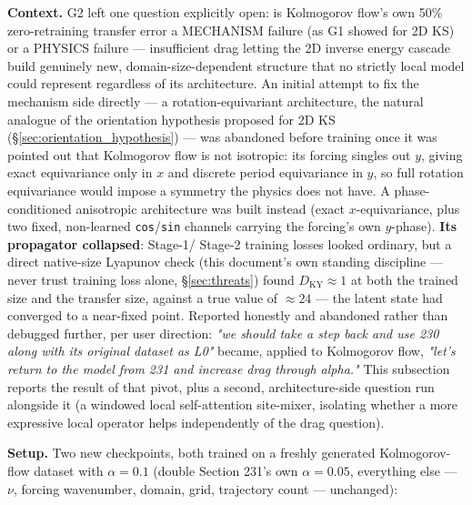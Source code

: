 \documentclass[11pt]{article}
\begin{document}
\textbf{Context.} G2 left one question explicitly open: is Kolmogorov
flow's own 50\% zero-retraining transfer error a MECHANISM failure (as
G1 showed for 2D KS) or a PHYSICS failure --- insufficient drag letting
the 2D inverse energy cascade build genuinely new, domain-size-dependent
structure that no strictly local model could represent regardless of its
architecture. An initial attempt to fix the mechanism side directly ---
a rotation-equivariant architecture, the natural analogue of the
orientation hypothesis proposed for 2D KS
(\S\ref{sec:orientation_hypothesis}) --- was abandoned before training
once it was pointed out that Kolmogorov flow is not isotropic: its
forcing singles out $y$, giving exact equivariance only in $x$ and
discrete period equivariance in $y$, so full rotation equivariance would
impose a symmetry the physics does not have. A phase-conditioned
anisotropic architecture was built instead (exact $x$-equivariance, plus
two fixed, non-learned \texttt{cos}/\texttt{sin} channels carrying the
forcing's own $y$-phase). \textbf{Its propagator collapsed}: Stage-1/
Stage-2 training losses looked ordinary, but a direct native-size
Lyapunov check (this document's own standing discipline --- never trust
training loss alone, \S\ref{sec:threats}) found $D_{\mathrm{KY}}\approx1$
at both the trained size and the transfer size, against a true value of
$\approx24$ --- the latent state had converged to a near-fixed point.
Reported honestly and abandoned rather than debugged further, per
user direction: \emph{"we should take a step back and use 230 along
with its original dataset as L0"} became, applied to Kolmogorov flow,
\emph{"let's return to the model from 231 and increase drag through
alpha."} This subsection reports the result of that pivot, plus a
second, architecture-side question run alongside it (a windowed local
self-attention site-mixer, isolating whether a more expressive local
operator helps independently of the drag question).

\textbf{Setup.} Two new checkpoints, both trained on a freshly generated
Kolmogorov-flow dataset with $\alpha=0.1$ (double Section 231's own
$\alpha=0.05$, everything else --- $\nu$, forcing wavenumber, domain,
grid, trajectory count --- unchanged):
\end{document}
